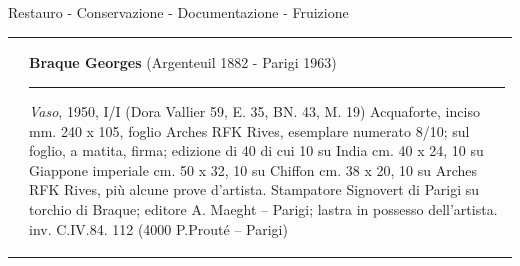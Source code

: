 \documentclass[hidelinks,aspectratio=169]{beamer}
\begin{document}
\begin{frame}{Restauro - Conservazione - Documentazione - Fruizione}
\begin{tabularx}{\linewidth}{XX}
{			}&{
				\vspace*{-65mm}
				\textbf{Braque Georges}
				\newline
				(Argenteuil 1882 - Parigi 1963)
				\newline
				\hrule
				\bigskip
				\small{\textit{Vaso}, 1950, I/I \newline
					(Dora Vallier 59, E. 35, BN. 43, M. 19)\newline
					Acquaforte, inciso mm. 240 x 105, foglio Arches RFK Rives, esemplare numerato 8/10; sul foglio, a matita, firma; edizione di 40 di cui 10 su India cm. 40 x 24, 10 su Giappone imperiale cm. 50 x 32, 10 su Chiffon cm. 38 x 20, 10 su Arches RFK Rives, più alcune prove d’artista. Stampatore Signovert di Parigi su torchio di Braque; editore A. Maeght – Parigi; lastra in possesso dell’artista. \newline
					inv. C.IV.84. 112 (4000 P.Prouté – Parigi)}
			}
		\end{tabularx}
	\end{frame}
	
\end{document}
